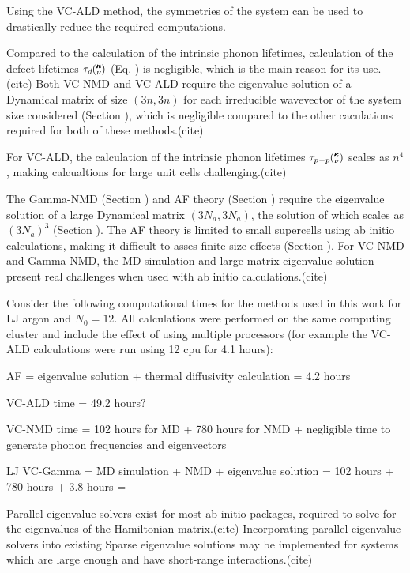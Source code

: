\documentclass[aps,prb,onecolumn,preprint,superscriptaddress,amsmath,amssymb,floatfix]{revtex4}
\newcommand{\kv}{\mspace{-4.0mu}\left(\mspace{-8.0mu}
\begin{smallmatrix}&\pmb{\kappa} \\&\nu\end{smallmatrix}
\mspace{-3.0mu}\right)}
\begin{document}
Using the VC-ALD method, the symmetries of the system can be 
used to drastically reduce the required computations.
\cite{esfarjani_method_2008,turney_predicting_2009,
esfarjani_heat_2011,chaput_phonon-phonon_2011} 


Compared to 
the calculation of the intrinsic phonon lifetimes, calculation 
of the defect lifetimes $\tau_d\kv$ (Eq. ) is negligible, which is the main 
reason for its use.(cite)
Both VC-NMD and VC-ALD require the eigenvalue solution 
of a Dynamical matrix of size $(3n,3n)$ for each irreducible wavevector 
of the system size considered (Section ), 
which is negligible compared to the other 
caculations required for both of these methods.(cite) 


For VC-ALD, the calculation of the intrinsic phonon 
lifetimes $\tau_{p-p}\kv$ scales as $n^4$,\cite{turney_predicting_2009}  
making calcualtions for large unit cells challenging.(cite) 

The Gamma-NMD (Section ) and AF theory (Section ) 
require the eigenvalue solution of a large Dynamical matrix $(3N_a,3N_a)$, 
the solution of which scales as $(3N_a)^3$ (Section ). 
The AF theory is limited 
to small supercells using ab initio calculations, making it difficult 
to asses finite-size effects (Section ).  For VC-NMD and Gamma-NMD, the MD 
simulation and large-matrix eigenvalue solution present real challenges 
when used with ab initio calculations.(cite)

Consider the following computational times for the methods used in 
this work for LJ argon and $N_0 = 12$. All calculations were performed 
on the same computing cluster and include the effect of using 
multiple processors (for example the VC-ALD calculations were run using 
12 cpu for 4.1 hours):

AF = eigenvalue solution + thermal diffusivity calculation = 4.2 hours

VC-ALD time = 49.2 hours?

VC-NMD time = 102 hours for MD + 780 hours for NMD + negligible time 
to generate phonon frequencies and eigenvectors


LJ VC-Gamma = MD simulation + NMD + eigenvalue solution =  
102 hours + 780 hours + 3.8 hours = 


Parallel eigenvalue solvers exist for most ab initio packages, required 
to solve for the eigenvalues of the Hamiltonian matrix.(cite) Incorporating 
parallel eigenvalue solvers into existing 
Sparse eigenvalue solutions may be implemented for systems which are 
large enough and have short-range interactions.(cite)
\end{document}
